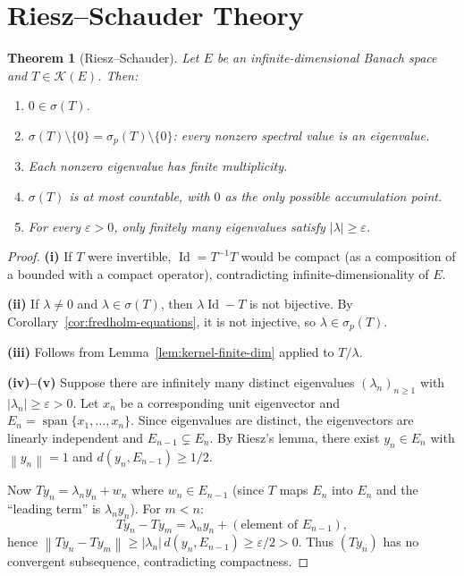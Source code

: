 \documentclass[a4paper,12pt]{book}
\DeclareMathOperator{\Id}{Id}
\DeclareMathOperator{\spn}{span}
\newcommand{\norm}[1]{\left\| #1 \right\|}
\newcommand{\abs}[1]{\left| #1 \right|}
\theoremstyle{definition}
\theoremstyle{plain}
\newtheorem{theorem}[definition]{Theorem}
\theoremstyle{remark}
\begin{document}
\section{Riesz--Schauder Theory}\label{sec:riesz-schauder}


\begin{theorem}[Riesz--Schauder]\label{thm:riesz-schauder}
Let $E$ be an infinite-dimensional Banach space and $T \in \mathcal{K}(E)$. Then:
\begin{enumerate}[label=(\roman*)]
  \item $0 \in \sigma(T)$.
  \item $\sigma(T) \setminus \{0\} = \sigma_p(T) \setminus \{0\}$: every nonzero
        spectral value is an eigenvalue.
  \item Each nonzero eigenvalue has finite multiplicity.
  \item $\sigma(T)$ is at most countable, with $0$ as the only possible
        accumulation point.
  \item For every $\varepsilon > 0$, only finitely many eigenvalues satisfy
        $\abs{\lambda} \ge \varepsilon$.
\end{enumerate}
\end{theorem}

\begin{proof}
\textbf{(i)} If $T$ were invertible, $\Id = T^{-1}T$ would be compact (as a
composition of a bounded with a compact operator), contradicting
infinite-dimensionality of $E$.

\textbf{(ii)} If $\lambda \ne 0$ and $\lambda \in \sigma(T)$, then $\lambda\Id - T$
is not bijective. By Corollary~\ref{cor:fredholm-equations}, it is not injective,
so $\lambda \in \sigma_p(T)$.

\textbf{(iii)} Follows from Lemma~\ref{lem:kernel-finite-dim} applied to $T/\lambda$.

\textbf{(iv)--(v)} Suppose there are infinitely many distinct eigenvalues
$(\lambda_n)_{n \ge 1}$ with $\abs{\lambda_n} \ge \varepsilon > 0$.
Let $x_n$ be a corresponding unit eigenvector and
$E_n = \spn\{x_1, \ldots, x_n\}$. Since eigenvalues are distinct, the
eigenvectors are linearly independent and $E_{n-1} \subsetneq E_n$.
By Riesz's lemma, there exist $y_n \in E_n$ with $\norm{y_n} = 1$ and
$d(y_n, E_{n-1}) \ge 1/2$.

Now $Ty_n = \lambda_n y_n + w_n$ where $w_n \in E_{n-1}$ (since $T$ maps $E_n$
into $E_n$ and the ``leading term'' is $\lambda_n y_n$). For $m < n$:
\[
  Ty_n - Ty_m = \lambda_n y_n + (\text{element of } E_{n-1}),
\]
hence $\norm{Ty_n - Ty_m} \ge \abs{\lambda_n}\, d(y_n, E_{n-1})
\ge \varepsilon / 2 > 0$. Thus $(Ty_n)$ has no convergent subsequence,
contradicting compactness.
\end{proof}
\end{document}
